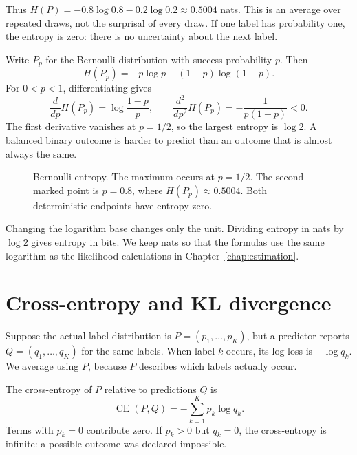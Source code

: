 Thus \(H(P)=-0.8\log0.8-0.2\log0.2\approx0.5004\) nats.
This is an average over repeated draws, not the surprisal of every draw.
If one label has probability one, the entropy is zero: there is no
uncertainty about the next label.

Write \(P_p\) for the Bernoulli distribution with success probability \(p\).
Then
\[
  H(P_p)=-p\log p-(1-p)\log(1-p).
\]
For \(0<p<1\), differentiating gives
\[
  \frac{d}{dp}H(P_p)=\log\frac{1-p}{p},\qquad
  \frac{d^2}{dp^2}H(P_p)=-\frac1{p(1-p)}<0.
\]
The first derivative vanishes at \(p=1/2\), so the largest entropy is
\(\log2\). A balanced binary outcome is harder to predict than an outcome
that is almost always the same.

\begin{figure}[H]
  \centering\InfoEntropyPlot
  \caption{Bernoulli entropy. The maximum occurs at \(p=1/2\).
  The second marked point is \(p=0.8\), where \(H(P_p)\approx0.5004\).
  Both deterministic endpoints have entropy zero.}
  \label{fig:binary-entropy}
\end{figure}

Changing the logarithm base changes only the unit. Dividing entropy in
nats by \(\log2\) gives entropy in bits. We keep nats so that the formulas
use the same logarithm as the likelihood calculations in Chapter~\ref{chap:estimation}.

\section{Cross-entropy and KL divergence}
\label{sec:cross-entropy-kl}

Suppose the actual label distribution is \(P=(p_1,\ldots,p_K)\), but a
predictor reports \(Q=(q_1,\ldots,q_K)\) for the same labels.
When label \(k\) occurs, its log loss is \(-\log q_k\).
We average using \(P\), because \(P\) describes which labels actually occur.

\begin{definition}
The cross-entropy of \(P\) relative to predictions \(Q\) is
\begin{equation}
  \operatorname{CE}(P,Q)=-\sum_{k=1}^Kp_k\log q_k.
  \label{eq:cross-entropy}
\end{equation}
Terms with \(p_k=0\) contribute zero. If \(p_k>0\) but \(q_k=0\),
the cross-entropy is infinite: a possible outcome was declared impossible.
\end{definition}


